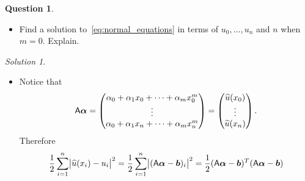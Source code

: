 \documentclass[11pt]{article}
\theoremstyle{definition}
\newtheorem{question}{Question}
\theoremstyle{remark}
\newtheorem*{solution}{Solution}
\begin{document}
\begin{question}
\begin{enumerate}
\begin{itemize}
            \item
                \mymark
                Find a solution to~\eqref{eq:normal_equations} in terms of $u_0, \dotsc, u_n$ and $n$ when $m = 0$.
                Explain.
        \end{itemize}
        \begin{solution}
            $~$
            \begin{itemize}
                \item Notice that
                    \[
                        \mathsf A \mathbf{\boldsymbol{\alpha}} =
                        \begin{pmatrix}
                            \alpha_0 + \alpha_1 x_0 + \dotsb + \alpha_m x_0^m \\
                            \vdots \\
                            \alpha_0 + \alpha_1 x_n + \dotsb + \alpha_m x_n^m
                        \end{pmatrix}
                        =
                        \begin{pmatrix}
                            \widehat u(x_0) \\
                            \vdots \\
                            \widehat u(x_n)
                        \end{pmatrix}.
                    \]
                    Therefore
                    \[
                        \frac{1}{2} \sum_{i=1}^{n} \bigl\lvert \widehat u(x_i)  - u_i \bigr\rvert^2
                        = \frac{1}{2} \sum_{i=1}^{n} \bigl\lvert (\mathsf A \mathbf{\boldsymbol{\alpha}}  - \mathbf{\boldsymbol{b}})_i \bigr\rvert^2
                        = \frac{1}{2} (\mathsf A \mathbf{\boldsymbol{\alpha}}  - \mathbf{\boldsymbol{b}})^T (\mathsf A \mathbf{\boldsymbol{\alpha}}  - \mathbf{\boldsymbol{b}})
                    \]


\end{itemize}
\end{solution}
\end{enumerate}
\end{question}
\end{document}
